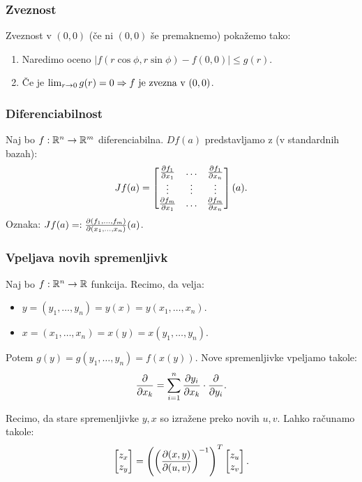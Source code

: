 \subsubsection*{Zveznost}
Zveznost v $(0,0)$ (če ni $(0,0)$ še premaknemo) pokažemo tako:
\begin{enumerate}
    \item Naredimo oceno $|f(r \cos \phi, r \sin \phi) - f(0,0)| \leq g(r).$
    \item Če je $\lim_{r \to 0} g(r) = 0 \Rightarrow f \text{ je zvezna v } (0,0)$.
\end{enumerate}

\subsubsection*{Diferenciabilnost}
Naj bo $f: \mathbb{R}^n \to \mathbb{R}^m$ diferenciabilna. $Df(a)$ predstavljamo z  (v standardnih bazah):
$$Jf(a) = \begin{bmatrix}
    \frac{\partial f_1}{\partial x_1} & \ldots & \frac{\partial f_1}{\partial x_n} \\
    \vdots & \vdots & \vdots \\
    \frac{\partial f_m}{\partial x_1} & \ldots & \frac{\partial f_m}{\partial x_n}
\end{bmatrix} (a).$$
Oznaka: $Jf(a) =: \frac{\partial (f_1, \ldots, f_m)}{\partial (x_1, \ldots, x_n)}(a)$.

\subsubsection*{Vpeljava novih spremenljivk}
Naj bo $f: \mathbb{R}^n \to \mathbb{R}$ funkcija. Recimo, da velja:
\begin{itemize}
    \item $y = (y_1, \ldots, y_n) = y(x) = y(x_1, \ldots, x_n)$.
    \item $x = (x_1, \ldots, x_n) = x(y) = x(y_1, \ldots, y_n)$.
\end{itemize}
Potem $g(y) = g(y_1, \ldots, y_n) = f(x(y))$. Nove spremenljivke vpeljamo takole:
$$\frac{\partial}{\partial x_k} = \sum_{i=1}^{n} \frac{\partial y_i}{\partial x_k} \cdot \frac{\partial }{\partial y_i}.$$

Recimo, da stare spremenljivke $y, x$ so izražene preko novih $u, v$. Lahko računamo takole:
$$\begin{bmatrix}
    z_x \\ z_y
\end{bmatrix} = \left(\left( \frac{\partial (x,y)}{\partial (u, v)} \right)^{-1} \right)^T \begin{bmatrix}
    z_u \\ z_v
\end{bmatrix}.$$

